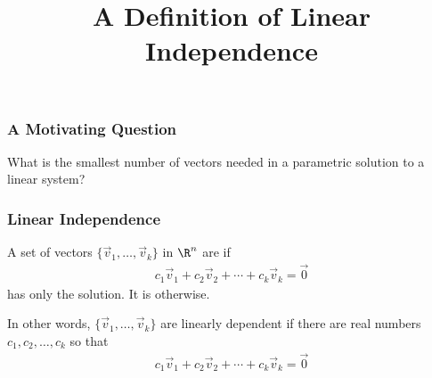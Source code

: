 \title{A Definition of Linear Independence} 
\subtitle{\SubTitleName}
\institute[]{\Course}
\author{\Instructor}
\maketitle   






\begin{frame}
\frametitle{A Motivating Question}

What is the smallest number of vectors needed in a parametric solution to a linear system?

\end{frame}



\begin{frame}
\frametitle{Linear Independence}

A set of vectors $\{\vec v_1,\ldots,\vec v_k\}$ in $\R^n$ are  if 
\begin{align*}
    c_1 \vec v_1+c_2 \vec v_2+\cdots+c_k \vec v_k= \vec 0
\end{align*}
has only the  solution. It is  otherwise.

\vspace{0.5cm} 

In other words, $\{\vec v_1,\ldots,\vec v_k\}$ are linearly dependent if there are real numbers $c_1,c_2,\ldots ,c_k$  so that
\begin{align*}
 c_1 \vec v_1+c_2 \vec v_2+\cdots+c_k \vec v_k= \vec 0
\end{align*}

\end{frame}









